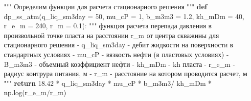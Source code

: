 \documentclass[
  russian,
  letterpaper,
  DIV=11,
  numbers=noendperiod,
  oneside]{scrartcl}
\newenvironment{Shaded}{\begin{snugshade}}{\end{snugshade}}
\newcommand{\CommentTok}[1]{\textcolor[rgb]{0.37,0.37,0.37}{#1}}
\newcommand{\ControlFlowTok}[1]{\textcolor[rgb]{0.00,0.23,0.31}{\textbf{#1}}}
\newcommand{\DecValTok}[1]{\textcolor[rgb]{0.68,0.00,0.00}{#1}}
\newcommand{\FloatTok}[1]{\textcolor[rgb]{0.68,0.00,0.00}{#1}}
\newcommand{\KeywordTok}[1]{\textcolor[rgb]{0.00,0.23,0.31}{\textbf{#1}}}
\newcommand{\NormalTok}[1]{\textcolor[rgb]{0.00,0.23,0.31}{#1}}
\newcommand{\OperatorTok}[1]{\textcolor[rgb]{0.37,0.37,0.37}{#1}}
\begin{document}
\begin{Shaded}
\begin{Highlighting}[]
\CommentTok{"""}
\CommentTok{Определим функции для расчета стационарного решения}
\CommentTok{"""}
\KeywordTok{def}\NormalTok{ dp\_ss\_atm(q\_liq\_sm3day }\OperatorTok{=} \DecValTok{50}\NormalTok{,}
\NormalTok{               mu\_cP }\OperatorTok{=} \DecValTok{1}\NormalTok{,}
\NormalTok{               b\_m3m3 }\OperatorTok{=} \FloatTok{1.2}\NormalTok{,}
\NormalTok{               kh\_mDm }\OperatorTok{=} \DecValTok{40}\NormalTok{,}
\NormalTok{               r\_e\_m }\OperatorTok{=} \DecValTok{240}\NormalTok{,}
\NormalTok{               r\_m }\OperatorTok{=} \FloatTok{0.1}\NormalTok{):}
  \CommentTok{"""}
\CommentTok{  функция расчета перепада давления в произвольной точке пласта }
\CommentTok{  на расстоянии r\_m от центра скважины для стационарного решения}
\CommentTok{  {-} q\_liq\_sm3day {-} дебит жидкости на поверхности в стандартных условиях}
\CommentTok{  {-} mu\_cP {-} вязкость нефти (в пластовых условиях)}
\CommentTok{  {-} B\_m3m3 {-} объемный коэффициент нефти }
\CommentTok{  {-} kh\_mDm {-} kh пласта}
\CommentTok{  {-} r\_e\_m {-} радиус контрура питания, м  }
\CommentTok{  {-} r\_m {-} расстояние на котором проводится расчет, м}
\CommentTok{  """}
  \ControlFlowTok{return} \FloatTok{18.42} \OperatorTok{*}\NormalTok{ q\_liq\_sm3day }\OperatorTok{*}\NormalTok{ mu\_cP }\OperatorTok{*}\NormalTok{ b\_m3m3}\OperatorTok{/}\NormalTok{ kh\_mDm }\OperatorTok{*}\NormalTok{ np.log(r\_e\_m}\OperatorTok{/}\NormalTok{r\_m)}


\end{Highlighting}
\end{Shaded}
\end{document}
